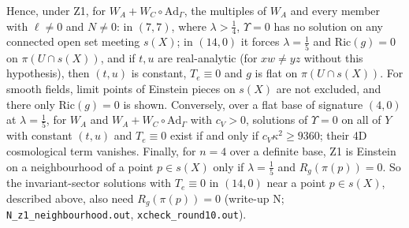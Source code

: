 \documentclass[11pt]{article}
\theoremstyle{remark}
\begin{document}
Hence, under Z1, for $W_A+W_C\circ\mathrm{Ad}_\Gamma$, the multiples of $W_A$ and every member with $\ell\neq0$ and $N\neq0$: in $(7,7)$, where $\lambda>\tfrac14$, $\Upsilon=0$ has no solution on any connected open set meeting $s(X)$; in $(14,0)$ it forces $\lambda=\tfrac15$ and $\mathrm{Ric}(g)=0$ on $\pi(U\cap s(X))$, and if $t,u$ are real-analytic (for $xw\neq yz$ without this hypothesis), then $(t,u)$ is constant, $T_e\equiv0$ and $g$ is flat on $\pi(U\cap s(X))$. For smooth fields, limit points of Einstein pieces on $s(X)$ are not excluded, and there only $\mathrm{Ric}(g)=0$ is shown. Conversely, over a flat base of signature $(4,0)$ at $\lambda=\tfrac15$, for $W_A$ and $W_A+W_C\circ\mathrm{Ad}_\Gamma$ with $c_V>0$, solutions of $\Upsilon=0$ on all of $Y$ with constant $(t,u)$ and $T_e\equiv0$ exist if and only if $c_V\kappa^2\ge9360$; their 4D cosmological term vanishes. Finally, for $n=4$ over a definite base, Z1 is Einstein on a neighbourhood of a point $p\in s(X)$ only if $\lambda=\tfrac15$ and $R_g(\pi(p))=0$. So the invariant-sector solutions with $T_e\equiv0$ in $(14,0)$ near a point $p\in s(X)$, described above, also need $R_g(\pi(p))=0$ (write-up N; \texttt{N\_z1\_neighbourhood.out}, \texttt{xcheck\_round10.out}).
\end{document}
